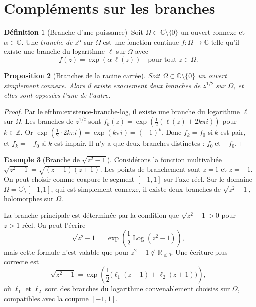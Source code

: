 \documentclass[12pt,a4paper,openany]{book}
\theoremstyle{definition}
\newtheorem{definition}{Définition}[chapter]
\newtheorem{exemple}[definition]{Exemple}
\theoremstyle{plain}
\newtheorem{proposition}[definition]{Proposition}
\theoremstyle{remark}
\newcommand{\C}{\mathbb{C}}
\newcommand{\R}{\mathbb{R}}
\newcommand{\Z}{\mathbb{Z}}
\DeclareMathOperator{\Log}{Log}
\begin{document}
\section{Compléments sur les branches}\label{sec:complements-branches}

\begin{definition}[Branche d'une puissance]\label{def:branche-puissance}
Soit $\Omega \subset \C \setminus \{0\}$ un ouvert connexe et $\alpha \in \C$. Une \emph{branche de $z^\alpha$} sur $\Omega$ est une fonction continue $f : \Omega \to \C$ telle qu'il existe une branche du logarithme $\ell$ sur $\Omega$ avec
\[
  f(z) = \exp(\alpha\,\ell(z)) \quad \text{pour tout } z \in \Omega.
\]
\end{definition}

\begin{proposition}[Branches de la racine carrée]\label{prop:branches-racine}
Soit $\Omega \subset \C \setminus \{0\}$ un ouvert simplement connexe. Alors il existe exactement deux branches de $z^{1/2}$ sur $\Omega$, et elles sont opposées l'une de l'autre.
\end{proposition}

\begin{proof}
Par le 
ef{thm:existence-branche-log}, il existe une branche du logarithme $\ell$ sur $\Omega$. Les branches de $z^{1/2}$ sont $f_k(z) = \exp(\frac{1}{2}(\ell(z) + 2k\pi i))$ pour $k \in \Z$. Or $\exp(\frac{1}{2} \cdot 2k\pi i) = \exp(k\pi i) = (-1)^k$. Donc $f_k = f_0$ si $k$ est pair, et $f_k = -f_0$ si $k$ est impair. Il n'y a que deux branches distinctes : $f_0$ et $-f_0$.
\end{proof}

\begin{exemple}[Branche de $\sqrt{z^2-1}$]\label{ex:branche-sqrt-z2-1}
Considérons la fonction multivaluée $\sqrt{z^2 - 1} = \sqrt{(z-1)(z+1)}$. Les points de branchement sont $z = 1$ et $z = -1$. On peut choisir comme coupure le segment $[-1,1]$ sur l'axe réel. Sur le domaine $\Omega = \C \setminus [-1,1]$, qui est simplement connexe, il existe deux branches de $\sqrt{z^2-1}$, holomorphes sur $\Omega$.

La branche principale est déterminée par la condition que $\sqrt{z^2-1} > 0$ pour $z > 1$ réel. On peut l'écrire
\[
  \sqrt{z^2-1} = \exp\!\left(\frac{1}{2}\Log(z^2-1)\right),
\]
mais cette formule n'est valable que pour $z^2-1 \notin \R_{\leq 0}$. Une écriture plus correcte est
\[
  \sqrt{z^2-1} = \exp\!\left(\frac{1}{2}\bigl(\ell_1(z-1) + \ell_2(z+1)\bigr)\right),
\]
où $\ell_1$ et $\ell_2$ sont des branches du logarithme convenablement choisies sur $\Omega$, compatibles avec la coupure $[-1,1]$.
\end{exemple}
\end{document}
